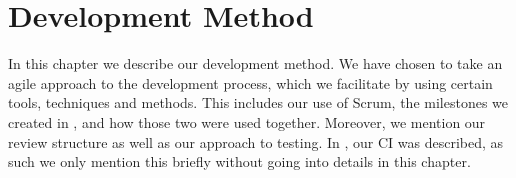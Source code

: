 \chapter{Development Method}\label{cha:development_method}
In this chapter we describe our development method.
We have chosen to take an agile approach to the development process, which we facilitate by using certain tools, techniques and methods.
This includes our use of Scrum, the milestones we created in , and how those two were used together.
Moreover, we mention our review structure as well as our approach to testing.
In , our \ac{CI} was described, as such we only mention this briefly without going into details in this chapter.

